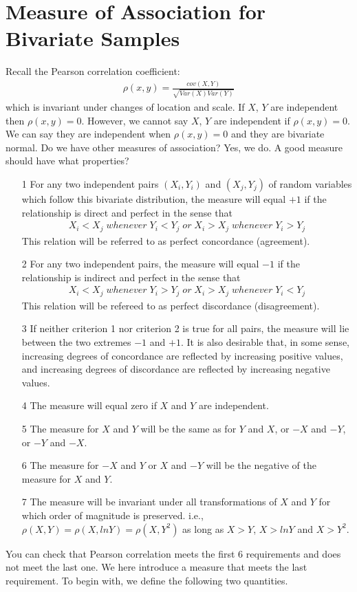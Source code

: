 \documentclass[twoside]{article}
\begin{document}
	\section{Measure of Association for Bivariate Samples}
	Recall the Pearson correlation coefficient:
	\begin{align*}
		\rho(x,y) = \frac{cov \left( X, Y \right)}{\sqrt{Var \left( X \right) Var \left( Y \right)}}
	\end{align*}
	which is invariant under changes of location and scale. If $X$, $Y$ are independent then $\rho(x,y) = 0$. However, we cannot say $X$, $Y$ are independent if $\rho(x,y) = 0$. We can say they are independent when $\rho(x,y) = 0$ and they are bivariate normal. Do we have other measures of association? Yes, we do. A good measure should have what properties? 
	\begin{itemize}
		\item[1] For any two independent pairs $(X_i, Y_i)$ and $(X_j, Y_j)$ of random variables which follow this bivariate distribution, the measure will equal $+1$ if the relationship is direct and perfect in the sense that
		\begin{align*}
			X_i < X_j \; whenever \; Y_i < Y_j \; or \; X_i > X_j \; whenever \; Y_i > Y_j
		\end{align*}
		This relation will be referred to as perfect concordance (agreement).
		\item[2] For any two independent pairs, the measure will equal $-1$ if the relationship is indirect and perfect in the sense that
		\begin{align*}
			X_i < X_j \; whenever \; Y_i > Y_j \; or \; X_i > X_j \; whenever \; Y_i < Y_j
		\end{align*}
		This relation will be refereed to as perfect discordance (disagreement).
		\item[3] If neither criterion 1 nor criterion 2 is true for all pairs, the measure will lie between the two extremes $-1$ and $+1$. It is also desirable that, in some sense, increasing degrees of concordance are reflected by increasing positive values, and increasing degrees of discordance are reflected by increasing negative values. 
		\item[4] The measure will equal zero if $X$ and $Y$ are independent. 
		\item[5] The measure for $X$ and $Y$ will be the same as for $Y$ and $X$, or $-X$ and $-Y$, or $-Y$ and $-X$. 
		\item[6] The measure for $-X$ and $Y$ or $X$ and $-Y$ will be the negative of the measure for $X$ and $Y$. 
		\item[7] The measure will be invariant under all transformations of $X$ and $Y$ for which order of magnitude is preserved. i.e., $\rho(X, Y) = \rho(X, lnY) = \rho(X, Y^2)$ as long as $X>Y$, $X > lnY$ and $X > Y^2$. 
	\end{itemize}
	You can check that Pearson correlation meets the first 6 requirements and does not meet the last one. We here introduce a measure that meets the last requirement. To begin with, we define the following two quantities. 
\end{document}
